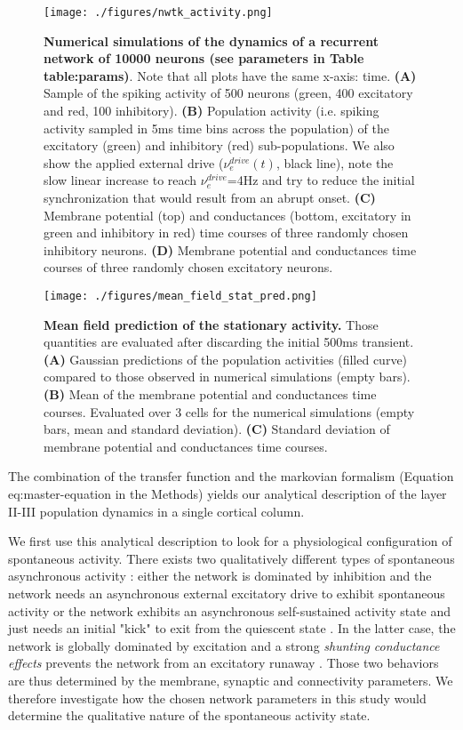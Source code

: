 \documentclass[8pt, colorlinks, a4paper]{article}
\renewcommand\ref{}
\begin{document}
\begin{figure}[tb!]
\centering
\texttt{[image: ./figures/nwtk\_activity.png]}
\caption{\label{fig:ntwk-act}\textbf{Numerical simulations of the dynamics of a recurrent network of 10000 neurons (see parameters in Table \ref{table:params})}. Note that all plots have the same x-axis: time. \textbf{(A)} Sample of the spiking activity of 500 neurons (green, 400 excitatory and red, 100 inhibitory). \textbf{(B)} Population activity (i.e. spiking activity sampled in 5ms time bins across the population) of the excitatory (green) and inhibitory (red) sub-populations. We also show the applied external drive (\(\nu_e^{drive}(t)\), black line), note the slow linear increase to reach \(\nu_e^{drive}\)=4Hz and try to reduce the initial synchronization that would result from an abrupt onset. \textbf{(C)} Membrane potential (top) and conductances (bottom, excitatory in green and inhibitory in red) time courses of three randomly chosen inhibitory neurons. \textbf{(D)} Membrane potential and conductances time courses of three randomly chosen excitatory neurons.}
\end{figure}


\begin{figure}[tb!]
\centering
\texttt{[image: ./figures/mean\_field\_stat\_pred.png]}
\caption{\label{fig:mf-stat-pred}\textbf{Mean field prediction of the stationary activity.} Those quantities are evaluated after discarding the initial 500ms transient. \textbf{(A)} Gaussian predictions of the population activities (filled curve) compared to those observed in numerical simulations (empty bars). \textbf{(B)} Mean of the membrane potential and conductances time courses. Evaluated over 3 cells for the numerical simulations (empty bars, mean and standard deviation). \textbf{(C)} Standard deviation of membrane potential and conductances time courses.}
\end{figure}

The combination of the transfer function and the markovian formalism
(Equation \ref{eq:master-equation} in the Methods) yields our analytical
description of the layer II-III population dynamics in a single
cortical column.

We first use this analytical description to look for a physiological
configuration of spontaneous activity. There exists two qualitatively
different types of spontaneous asynchronous activity
\cite{Vogels2005,Kumar2008}: either the network is dominated by
inhibition and the network needs an asynchronous external excitatory
drive to exhibit spontaneous activity \cite{Amit1997,Brunel2000} or
the network exhibits an asynchronous self-sustained activity state and
just needs an initial "kick" to exit from the quiescent state
\cite{Vogels2005,Kumar2008,ElBoustani2009}. In the latter case, the
network is globally dominated by excitation and a strong
\emph{shunting conductance effects} prevents the network from an
excitatory runaway \cite{Kuhn2004,Kumar2008}. Those two behaviors are
thus determined by the membrane, synaptic and connectivity
parameters. We therefore investigate how the chosen network parameters
in this study would determine the qualitative nature of the
spontaneous activity state.
\end{document}
